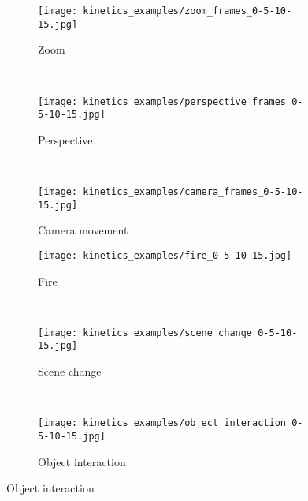 \documentclass{article} \usepackage{iclr2020_conference,times}
\begin{document}
\begin{figure}[t]
    \captionsetup{font=small}
    \begin{subfigure}{0.31\textwidth}
    \texttt{[image: kinetics\_examples/zoom\_frames\_0-5-10-15.jpg]}\vspace{-0.5em}
    \caption{Zoom} \label{fig:zoom}
    \end{subfigure}
    ~
    \begin{subfigure}{0.31\textwidth}
    \texttt{[image: kinetics\_examples/perspective\_frames\_0-5-10-15.jpg]}\vspace{-0.5em}
    \caption{Perspective} \label{fig:perspective}
    \end{subfigure}
    ~
    \begin{subfigure}{0.31\textwidth}
    \texttt{[image: kinetics\_examples/camera\_frames\_0-5-10-15.jpg]}\vspace{-0.5em}
    \caption{Camera movement} \label{fig:camera}
    \end{subfigure}
    \vspace{0.2em}
    
    \begin{subfigure}{0.31\textwidth}
    \texttt{[image: kinetics\_examples/fire\_0-5-10-15.jpg]}\vspace{-0.5em}
    \caption{Fire} \label{fig:fire}
    \end{subfigure}
    ~
    \begin{subfigure}{0.31\textwidth}
    \texttt{[image: kinetics\_examples/scene\_change\_0-5-10-15.jpg]}\vspace{-0.5em}
    \caption{Scene change} \label{fig:scene_change}
    \end{subfigure}
    ~
    \begin{subfigure}{0.31\textwidth}
    \texttt{[image: kinetics\_examples/object\_interaction\_0-5-10-15.jpg]}\vspace{-0.5em}
    \caption{Object interaction} \label{fig:}
    \end{subfigure}
    \vspace{0.2em}
    

\end{figure}
\end{document}
